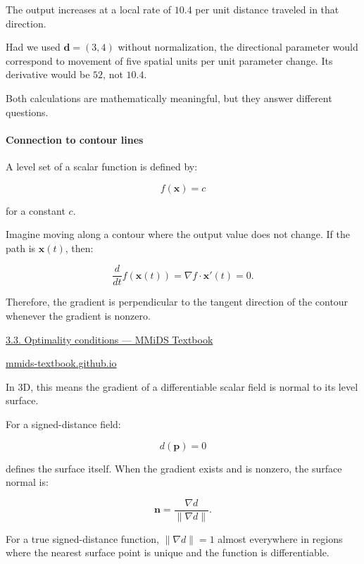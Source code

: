 The output increases at a local rate of \(10.4\) per unit distance traveled in that direction.

Had we used \(\mathbf d=(3,4)\) without normalization, the directional parameter would correspond to movement of five spatial units per unit parameter change. Its derivative would be \(52\), not \(10.4\).

Both calculations are mathematically meaningful, but they answer different questions.

\paragraph{Connection to contour lines}\label{02-foundations-ii-ch021-connection-to-contour-lines}

A level set of a scalar function is defined by:

\[
f(\mathbf x)=c
\]

for a constant \(c\).

Imagine moving along a contour where the output value does not change. If the path is \(\mathbf x(t)\), then:

\[
\frac d{dt}f(\mathbf x(t)) = \nabla f\cdot\mathbf x'(t)=0.
\]

Therefore, the gradient is perpendicular to the tangent direction of the contour whenever the gradient is nonzero.

\href{https://images.openai.com/static-rsc-4/v46Mm5YWBYnLwLfo1X8evI0zsZ6KQblMrBzNblf8TQLA-sQyDBWZ0mUgOBYe8xGNst9diAopOVwwDJp922HzIS0Wu6TtpLFzxPZjmFnZNX6_cmlh-XAHYLSntx-FivIjSE9LquhxX5wmwLGMb6B8x-zvsRNbuOiNaWWc-qQe2bE?purpose=inline}{3.3. Optimality conditions --- MMiDS Textbook}

\href{https://mmids-textbook.github.io/chap03_opt/03_optimality/roch-mmids-opt-optimality.html?utm_source=chatgpt.com}{mmids-textbook.github.io}

In 3D, this means the gradient of a differentiable scalar field is normal to its level surface.

For a signed-distance field:

\[
d(\mathbf p)=0
\]

defines the surface itself. When the gradient exists and is nonzero, the surface normal is:

\[
\mathbf n= \frac{\nabla d}{\|\nabla d\|}.
\]

For a true signed-distance function, \(\|\nabla d\|=1\) almost everywhere in regions where the nearest surface point is unique and the function is differentiable.


